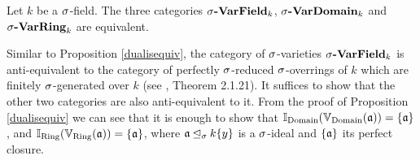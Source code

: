 \begin{prop}
Let $k$ be a $\sigma$-field. The three categories $\sigma\text{{\normalfont\textbf{-VarField}}}_k$, $\sigma\text{{\normalfont\textbf{-VarDomain}}}_k$ and $\sigma\text{{\normalfont\textbf{-VarRing}}}_k$ are equivalent.

\begin{bew}
Similar to Proposition \ref{dualisequiv}, the category of $\sigma$-varieties $\sigma\text{{\normalfont\textbf{-VarField}}}_k$ is anti-equivalent to the category of perfectly $\sigma$-reduced $\sigma$-overrings of $k$ which are finitely $\sigma$-generated over $k$ (see \cite{wibmer}, Theorem 2.1.21).
It suffices to show that the other two categories are also anti-equivalent to it. From the proof of Proposition \ref{dualisequiv} we can see that it is enough to show that $\mathbb{I}_{\operatorname{Domain}}(\mathbb{V}_{\operatorname{Domain}}(\mathfrak{a})) = \{\mathfrak{a}\}$, and $\mathbb{I}_{\operatorname{Ring}}(\mathbb{V}_{\operatorname{Ring}}(\mathfrak{a})) = \{\mathfrak{a}\}$,
 where $\mathfrak{a} \unlhd_{\sigma} k\{y\}$ is a $\sigma$-ideal and $\{ \mathfrak{a} \}$ its perfect closure. 


\end{bew}
\end{prop}
